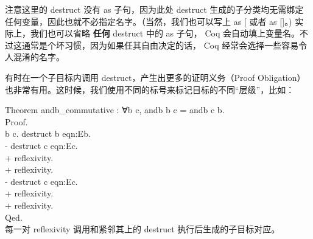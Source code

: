 \documentclass[utf8]{ctexart}
\begin{document}
注意这里的 {{destruct}} 没有 {{as}} 子句，因为此处 {{destruct}}
生成的子分类均无需绑定任何变量，因此也就不必指定名字。（当然，我们也可以写上
{{as}} {{[}\textbar{]}} 或者 {{as}} {{[}{]}}。) 实际上，我们也可以省略
\textbf{任何} {{destruct}} 中的 {{as}} 子句， Coq
会自动填上变量名。不过这通常是个坏习惯，因为如果任其自由决定的话， Coq
经常会选择一些容易令人混淆的名字。

有时在一个子目标内调用 {{destruct}}，产生出更多的证明义务（Proof
Obligation）
也非常有用。这时候，我们使用不同的标号来标记目标的不同``层级''，比如：

{Theorem} {andb\_commutative} : {∀}{b} {c}, {andb} {b} {c} = {andb} {c}
{b}.\\
{Proof}.\\
\hspace*{0.333em}\hspace*{0.333em}{intros} {b} {c}. {destruct} {b}
{eqn}:{Eb}.\\
\hspace*{0.333em}\hspace*{0.333em}- {destruct} {c} {eqn}:{Ec}.\\
\hspace*{0.333em}\hspace*{0.333em}\hspace*{0.333em}\hspace*{0.333em}+
{reflexivity}.\\
\hspace*{0.333em}\hspace*{0.333em}\hspace*{0.333em}\hspace*{0.333em}+
{reflexivity}.\\
\hspace*{0.333em}\hspace*{0.333em}- {destruct} {c} {eqn}:{Ec}.\\
\hspace*{0.333em}\hspace*{0.333em}\hspace*{0.333em}\hspace*{0.333em}+
{reflexivity}.\\
\hspace*{0.333em}\hspace*{0.333em}\hspace*{0.333em}\hspace*{0.333em}+
{reflexivity}.\\
{Qed}.\\

每一对 {{reflexivity}} 调用和紧邻其上的 {{destruct}}
执行后生成的子目标对应。
\end{document}
